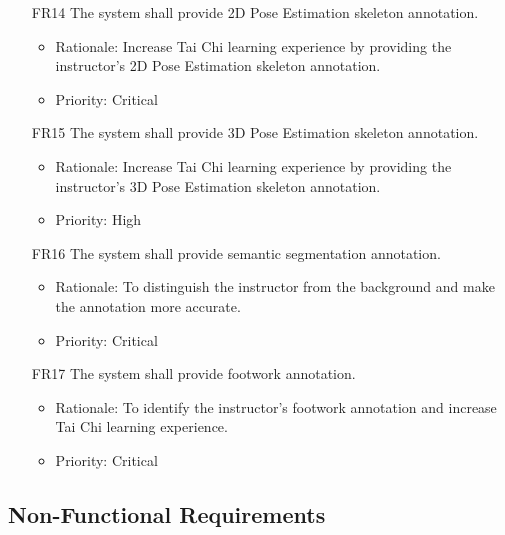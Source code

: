 \documentclass[12pt]{article}
\begin{document}
\begin{itemize}
\color{red}
    \item[FR14] The system shall provide 2D Pose Estimation skeleton annotation.\label{FR14}
    \begin{itemize}
        \item Rationale: Increase Tai Chi learning experience by providing the instructor's 2D Pose Estimation skeleton annotation.
        \item Priority: Critical
    \end{itemize}
\end{itemize}
\begin{itemize}
\color{red}
    \item[FR15] The system shall provide 3D Pose Estimation skeleton annotation.  \label{FR15}
    \begin{itemize}
        \item Rationale: Increase Tai Chi learning experience by providing the instructor's 3D Pose Estimation skeleton annotation.
        \item Priority: High
    \end{itemize}
\end{itemize}
\begin{itemize}
\color{red}
    \item[FR16] The system shall provide semantic segmentation annotation.  \label{FR16}
    \begin{itemize}
        \item Rationale: To distinguish the instructor from the background and make the annotation more accurate.
        \item Priority: Critical
    \end{itemize}
\end{itemize}
\begin{itemize}
    \color{red}
        \item[FR17] The system shall provide footwork annotation.  \label{FR17}
        \begin{itemize}
            \item Rationale: To identify the instructor's footwork annotation and increase Tai Chi learning experience.
            \item Priority: Critical
        \end{itemize}
    \end{itemize}
\subsection{Non-Functional Requirements}
\end{document}
